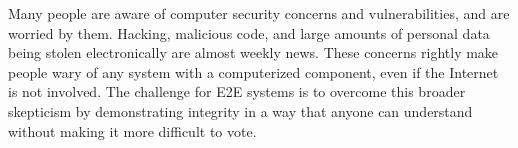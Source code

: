 Many people are aware of computer security concerns and
vulnerabilities, and are worried by them. Hacking, malicious code, and
large amounts of personal data being stolen electronically are almost
weekly news. These concerns rightly make people wary of any system
with a computerized component, even if the Internet is not
involved. The challenge for E2E systems is to overcome this broader
skepticism by demonstrating integrity in a way that anyone can
understand without making it more difficult to vote.

